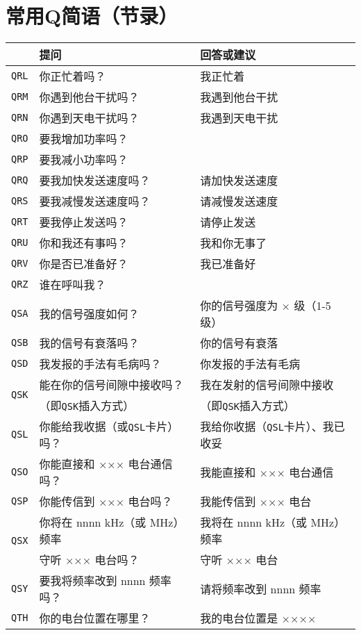 \newpage

\section{常用Q简语（节录）}

\begin{longtable}{|l|l|l|}
	\hline
	 & \textbf{提问} & \textbf{回答或建议} \\
	\hline
	\texttt{QRL} & 你正忙着吗？ & 我正忙着 \\
	\hline
	\texttt{QRM} & 你遇到他台干扰吗？ & 我遇到他台干扰 \\
	\hline
	\texttt{QRN} & 你遇到天电干扰吗？ & 我遇到天电干扰 \\
	\hline
	\texttt{QRO} & 要我增加功率吗？ & \\
	\hline
	\texttt{QRP} & 要我减小功率吗？ & \\
	\hline
	\texttt{QRQ} & 要我加快发送速度吗？ & 请加快发送速度 \\
	\hline
	\texttt{QRS} & 要我减慢发送速度吗？ & 请减慢发送速度 \\
	\hline
	\texttt{QRT} & 要我停止发送吗？ & 请停止发送 \\
	\hline
	\texttt{QRU} & 你和我还有事吗？ & 我和你无事了 \\
	\hline
	\texttt{QRV} & 你是否已准备好？ & 我已准备好 \\
	\hline
	\texttt{QRZ} & 谁在呼叫我？ & \\
	\hline
	\texttt{QSA} & 我的信号强度如何？ & 你的信号强度为 × 级（1-5 级） \\
	\hline
	\texttt{QSB} & 我的信号有衰落吗？ & 你的信号有衰落 \\
	\hline
	\texttt{QSD} & 我发报的手法有毛病吗？ & 你发报的手法有毛病 \\
	\hline
	\multirow{2}{1em}{\texttt{QSK}} & 能在你的信号间隙中接收吗？ & 我在发射的信号间隙中接收 \\
	& （即\texttt{QSK}插入方式）    & （即\texttt{QSK}插入方式） \\
	\hline
	\texttt{QSL} & 你能给我收据（或\texttt{QSL}卡片）吗？ & 我给你收据（\texttt{QSL}卡片）、我已收妥 \\
	\hline
	\texttt{QSO} & 你能直接和 ××× 电台通信吗？ & 我能直接和 ××× 电台通信 \\
	\hline
	\texttt{QSP} & 你能传信到 ××× 电台吗？ & 我能传信到 ××× 电台 \\
	\hline
	\multirow{2}{1em}{\texttt{QSX}} & 你将在 nnnn \si{\kHz}（或 \si{\MHz}）频率 & 我将在 nnnn \si{\kHz}（或 \si{\MHz}）频率 \\
	    & 守听 ××× 电台吗？ & 守听 ××× 电台 \\
	\hline
	\texttt{QSY} & 要我将频率改到 nnnn 频率吗？ & 请将频率改到 nnnn 频率 \\
	\hline
	\texttt{QTH} & 你的电台位置在哪里？ & 我的电台位置是 ×××× \\
	\hline
\end{longtable}

